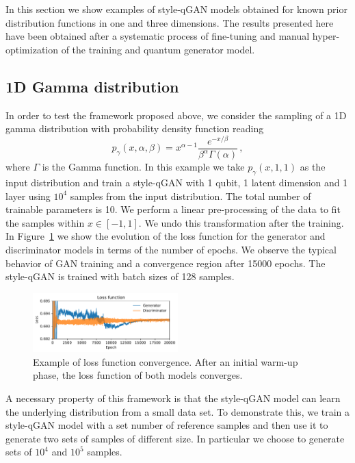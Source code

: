 \documentclass[twocolumn,preprintnumbers,superscriptaddress]{revtex4-2}
\begin{document}
In this section we show examples of style-qGAN models obtained for known prior
distribution functions in one and three dimensions. The results presented here
have been obtained after a systematic process of fine-tuning and manual
hyper-optimization of the training and quantum generator model.

\subsection{1D Gamma distribution}
\label{sec:gamma}

In order to test the framework proposed above, we
consider the sampling of a 1D gamma distribution with probability density
function reading
\begin{equation}
  p_\gamma (x, \alpha, \beta) = x^{\alpha-1} \frac{e^{-x/\beta}}{\beta^\alpha \Gamma(\alpha)}\,,
\end{equation}
where $\Gamma$ is the Gamma function. In this example we take $p_\gamma (x, 1,
1)$ as the input distribution and train a style-qGAN with 1 qubit, 1 latent dimension and
1 layer using $10^4$ samples from the input distribution. The total number of trainable parameters is 10. We perform a linear pre-processing of the data to fit the samples within $x \in [-1, 1]$. We undo this transformation after the training.
%
In Figure~\ref{fig:loss} we show the evolution of the loss function for the
generator and discriminator models in terms of the number of epochs. We observe the
typical behavior of GAN training and a convergence region after 15000 epochs.
%
The style-qGAN is trained with batch sizes of 128 samples.

\begin{figure}
  \includegraphics[width=0.5\textwidth]{plots/1Dgamma/1Dgamma_loss.pdf}
  \caption{\label{fig:loss}Example of loss function convergence. After an
  initial warm-up phase, the loss function of both models converges.}
\end{figure}

A necessary property of this framework is that the style-qGAN model can learn the underlying distribution from a small data set. To demonstrate this, we train a style-qGAN model with a set number of reference samples and then use it to generate two sets of samples of different size. In particular we choose to generate sets of $10^4$ and $10^5$ samples.
\end{document}
